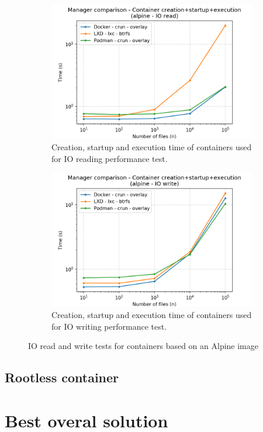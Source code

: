 \begin{figure}[h!]
    \begin{subfigure}{.5\textwidth}
      \centering
      \includegraphics[width=\linewidth]{images/manager/manager-full-alpine---IO-read.png}
      \caption{Creation, startup and execution time of containers used for IO reading performance test.}
      \label{fig:manager:io-read-full}
    \end{subfigure}
    \begin{subfigure}{.5\textwidth}
      \centering
      \includegraphics[width=\linewidth]{images/manager/manager-full-alpine---IO-write.png}
      \caption{Creation, startup and execution time of containers used for IO writing performance test.}
      \label{fig:manager:io-write-full}
    \end{subfigure}
    
    \caption{IO read and write tests for containers based on an Alpine image}
    \label{fig:manager:db}
\end{figure}

\clearpage
\subsection{Rootless container}

\section{Best overal solution}
